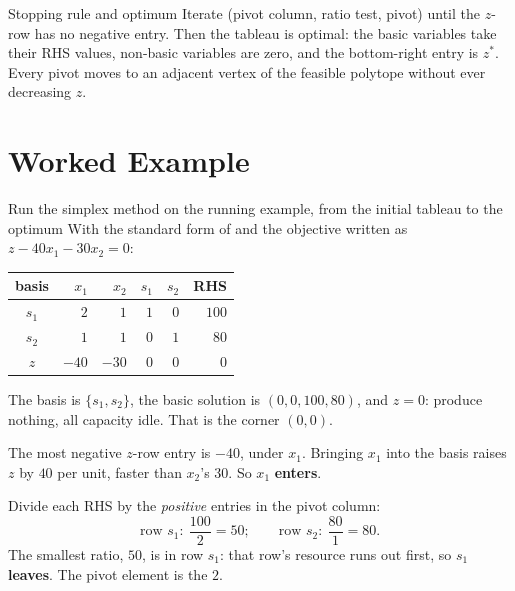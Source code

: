 \begin{rulebox}{Stopping rule and optimum}
Iterate (pivot column, ratio test, pivot) until the $z$-row has no
negative entry. Then the tableau is optimal: the basic
variables take their RHS values, non-basic variables are zero, and the
bottom-right entry is $z^{*}$. Every pivot moves to an adjacent vertex of
the feasible polytope without ever decreasing $z$.
\end{rulebox}

\section{Worked Example}

\begin{worked}{Run the simplex method on the running example, from the initial tableau to the optimum}
With the standard form of  and the objective written as
$z-40x_{1}-30x_{2}=0$:
\begin{center}\footnotesize
\begin{tabular}{c|rrrr|r}
  \hline
  basis & $x_{1}$ & $x_{2}$ & $s_{1}$ & $s_{2}$ & RHS\\
  \hline
  $s_{1}$ & $2$ & $1$ & $1$ & $0$ & $100$\\
  $s_{2}$ & $1$ & $1$ & $0$ & $1$ & $80$\\
  \hline
  $z$ & $-40$ & $-30$ & $0$ & $0$ & $0$\\
  \hline
\end{tabular}
\end{center}
The basis is $\{s_{1},s_{2}\}$, the basic solution is $(0,0,100,80)$, and
$z=0$: produce nothing, all capacity idle. That is the corner $(0,0)$.

The most negative $z$-row entry is $-40$, under $x_{1}$. Bringing $x_{1}$
into the basis raises $z$ by $40$ per unit, faster than $x_{2}$'s $30$. So
$x_{1}$ \textbf{enters}.

Divide each RHS by the \emph{positive} entries in the pivot column:
\[
  \text{row }s_{1}:\ \frac{100}{2}=50 ;
  \qquad
  \text{row }s_{2}:\ \frac{80}{1}=80 .
\]
The smallest ratio, $50$, is in row $s_{1}$: that row's resource runs out
first, so $s_{1}$ \textbf{leaves}. The pivot element is the $2$.


\end{worked}
